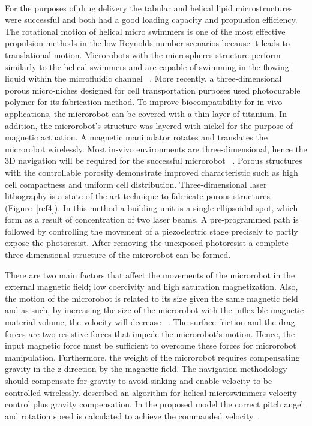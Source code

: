 \documentclass[a4paper,11pt]{article}
\begin{document}
\begin{sloppypar}
\paragraph{}
 For the purposes of drug delivery the tabular and helical lipid microstructures were successful
 and both had a good loading capacity and propulsion efficiency. The rotational motion of helical micro
 swimmers is one of the most effective propulsion methods in the low Reynolds number scenarios 
because it leads to translational motion. Microrobots with the microspheres structure perform similarly 
to the helical swimmers and are capable of swimming in the flowing liquid within the microfluidic channel ~\citep{kim2013fabrication}. 
More recently, a three-dimensional porous micro-niches designed for cell transportation purposes used
 photocurable polymer for its fabrication method. To improve biocompatibility for in-vivo applications, the 
microrobot can be covered with a thin layer of titanium. In addition, the microrobot\rq{}s structure was layered with 
nickel for the purpose of magnetic actuation. A magnetic manipulator rotates and translates the 
microrobot wirelessly. Most in-vivo environments are three-dimensional, hence the 3D navigation will be 
required for the successful microrobot ~\citep{kim2013fabrication}.
Porous structures with the controllable porosity demonstrate improved characteristic such as high cell 
compactness and uniform cell distribution. Three-dimensional 
laser lithography is a state of the art technique to fabricate porous structures (Figure~\ref{ref4}). In this method a building unit is a 
single ellipsoidal spot, which form as a result of concentration of two laser beams. A pre-programmed path 
is followed by controlling the movement of a piezoelectric stage precisely to partly expose the photoresist.
 After removing the unexposed photoresist a complete three-dimensional structure of the microrobot can 
be formed.   

There are two main factors that affect the movements of the microrobot in the external magnetic
 field; low coercivity and high saturation magnetization. Also, the motion of the microrobot is related to 
its size given the same magnetic field and as such, by increasing the size of the microrobot with the inflexible magnetic material
 volume, the velocity will decrease ~\citep{kim2013fabrication}. 
The surface friction and the drag forces are two resistive forces that impede the microrobot\rq{}s 
motion. Hence, the input magnetic force must be sufficient to overcome these forces for microrobot 
manipulation. Furthermore, the weight of the microrobot requires compensating gravity in the z-direction by 
the magnetic field. The navigation methodology should compensate for gravity to avoid sinking and enable velocity to be 
controlled wirelessly. \citeauthor{mahoney2011velocity} described an algorithm for helical microswimmers velocity 
control plus gravity compensation. In the proposed model the correct pitch angel and 
rotation speed is calculated to achieve the commanded velocity~\citep{mahoney2011velocity}.




\end{sloppypar}
\end{document}

